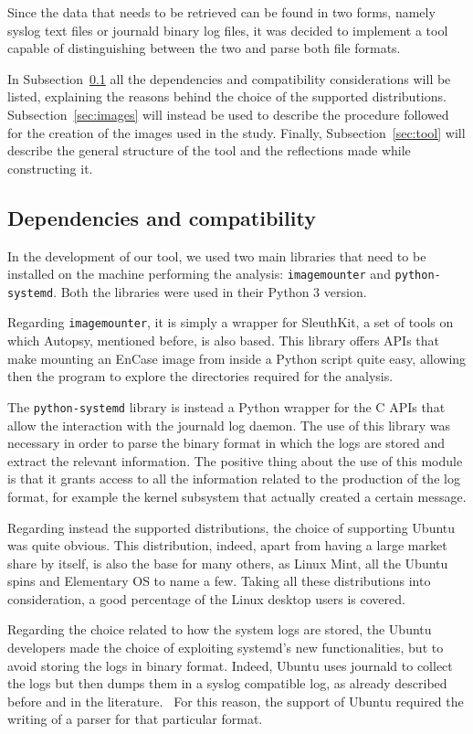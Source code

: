 \documentclass[a4paper]{article}
\begin{document}
Since the data that needs to be retrieved can be found in two forms, namely
syslog text files or journald binary log files, it was decided to implement a
tool capable of distinguishing between the two and parse both file formats.

In Subsection~\ref{sec:prems} all the dependencies and compatibility
considerations will be listed, explaining the reasons behind the choice of the
supported distributions. Subsection~\ref{sec:images} will instead be used to
describe the procedure followed for the creation of the images used in the
study. Finally, Subsection~\ref{sec:tool} will describe the general structure of
the tool and the reflections made while constructing it.

\subsection{Dependencies and compatibility}
\label{sec:prems}
In the development of our tool, we used two main libraries that need
to be installed on the machine performing the analysis:
\texttt{imagemounter} and \texttt{python-systemd}. Both the libraries were used
in their Python 3 version.

Regarding \texttt{imagemounter}, it is simply a wrapper for SleuthKit, a set of
tools on which Autopsy, mentioned before, is also based.  This library offers
APIs that make mounting an EnCase image from inside a Python script quite easy,
allowing then the program to explore the directories required for the analysis.

The \texttt{python-systemd} library is instead a Python wrapper for the C APIs
that allow the interaction with the journald log daemon. The use of this library
was necessary in order to parse the binary format in which the logs are stored
and extract the relevant information. The positive thing about the use of this
module is that it grants access to all the information related to the production
of the log format, for example the kernel subsystem that actually created a
certain message.

Regarding instead the supported distributions, the choice of supporting Ubuntu
was quite obvious. This distribution, indeed, apart from having a large market
share by itself, is also the base for many others, as Linux Mint, all the Ubuntu
spins and Elementary OS to name a few. Taking all these distributions into
consideration, a good percentage of the Linux desktop users is covered.

Regarding the choice related to how the system logs are stored, the Ubuntu
developers made the choice of exploiting systemd's new functionalities, but to
avoid storing the logs in binary format. Indeed, Ubuntu uses journald to collect
the logs but then dumps them in a syslog compatible log, as already described
before and in the literature.~\cite{patil2016digital} For this reason, the
support of Ubuntu required the writing of a parser for that particular format.
\end{document}
